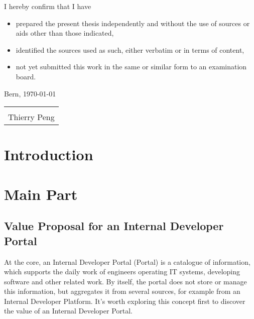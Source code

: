 \documentclass[a4paper,12pt]{article}
\begin{document}
    I hereby confirm that I have
    \begin{itemize}
        \item prepared the present thesis independently and without the use of sources or aids other than those indicated,
        \item identified the sources used as such, either verbatim or in terms of content,
        \item not yet submitted this work in the same or similar form to an examination board.
    \end{itemize}
    Bern, \today\newline
    \newline
    \newline
    \newline
    \begin{tabular}{@{}p{5.0cm}@{}}
        \hrulefill \\
        Thierry Peng
    \end{tabular}

    \pagebreak

    \section{Introduction}

    \section{Main Part}
    \subsection{Value Proposal for an Internal Developer Portal}
    At the core, an Internal Developer Portal (Portal) is a catalogue of information, which supports the daily work of
    engineers operating IT systems, developing software and other related work.
    By itself, the portal does not store or manage this information, but aggregates it from several sources, for example from an Internal Developer Platform.
    It's worth exploring this concept first to discover the value of an Internal Developer Portal.
\end{document}
